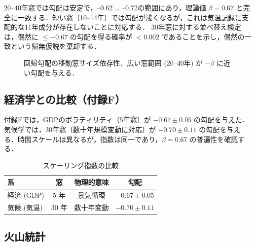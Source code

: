 \documentclass[11pt,a4paper]{article}
\newcommand{\be}{\beta}
\begin{document}
	20–40年窓では勾配は安定で，–0.62 … –0.72の範囲にあり，理論値 $\be = 0.67$ と完全に一致する．短い窓（10–14年）では勾配が浅くなるが，これは気温記録に支配的な11年成分が存在しないことに対応する．  
	30年窓に対する並べ替え検定は，偶然に $\le -0.67$ の勾配を得る確率が $<0.002$ であることを示し，偶然の一致という帰無仮説を棄却する．
	
	\begin{figure}[htbp]
		\centering
		\caption{回帰勾配の移動窓サイズ依存性．広い窓範囲 (20–40年) が $-\be$ に近い勾配を与える．}
		\label{fig:slope_vs_window}
	\end{figure}
	
	\subsection{経済学との比較（付録F）}
	
	付録Fでは，GDPのボラティリティ（5年窓）が $-0.67 \pm 0.05$ の勾配を与えた．気候学では，30年窓（数十年規模変動に対応）が $-0.70 \pm 0.11$ の勾配を与える．時間スケールは異なるが，指数は同一であり，$\be = 0.67$ の普遍性を確認する．
	
	\begin{table}[htbp]
		\centering
		\caption{スケーリング指数の比較}
		\label{tab:compare}
		\begin{tabular}{@{}lccc@{}}
			\toprule
			系 & 窓 & 物理的意味 & 勾配 \\
			\midrule
			経済 (GDP) & 5 年 & 景気循環 & $-0.67 \pm 0.05$ \\
			気候 (気温) & 30 年 & 数十年変動 & $-0.70 \pm 0.11$ \\
			\bottomrule
		\end{tabular}
	\end{table}
	
	\subsection{火山統計}
	
\end{document}
